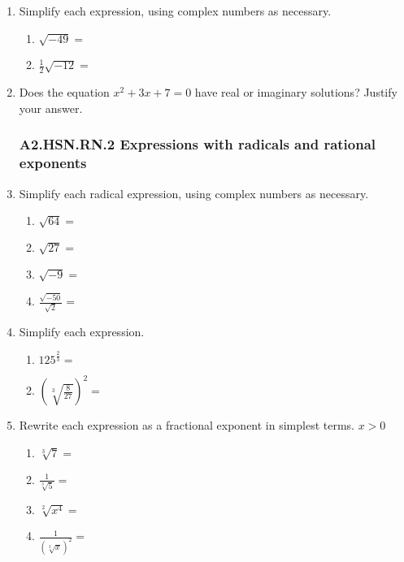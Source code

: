 \documentclass[12pt, twoside]{article}
\begin{document}
\begin{enumerate}[itemsep=0.5cm]
\item Simplify each expression, using complex numbers as necessary.
    \begin{multicols}{2}
    \begin{enumerate}[itemsep=0.5cm]
        \item $\sqrt{-49}=$
        \item $\displaystyle \frac{1}{2} \sqrt{-12}=$
    \end{enumerate}
    \end{multicols} \vspace{1cm}

\item Does the equation $x^2 + 3x + 7 = 0$ have real or imaginary solutions? Justify your answer.

\newpage
\subsubsection*{A2.HSN.RN.2 Expressions with radicals and rational exponents}
\item Simplify each radical expression, using complex numbers as necessary.
    \begin{multicols}{2}
    \begin{enumerate}[itemsep=0.5cm]
        \item $\sqrt{64}=$
        \item $\sqrt{27}=$
        \item $\sqrt{-9}=$
        \item $\displaystyle \frac{\sqrt{-50}}{\sqrt{2}}=$
    \end{enumerate}
    \end{multicols} \vspace{1cm}
    
\item Simplify each expression.
    \begin{multicols}{2}
    \begin{enumerate}[itemsep=0.5cm]
        \item $\displaystyle 125^{\frac{2}{3}} =$
        \item $\left( \sqrt[3]{\frac{8}{27}} \right)^{2} =$
    \end{enumerate}
    \end{multicols} \vspace{2cm}

    
\item Rewrite each expression as a fractional exponent in simplest terms. $x>0$
    \begin{multicols}{2}
      \begin{enumerate}[itemsep=1cm]
          \item $\sqrt[3]{7} =$
          \item $\displaystyle \frac{1}{\sqrt[3]{5}}=$
          \item $\sqrt[2]{x^4} =$
          \item $\displaystyle \frac{1}{(\sqrt[3]{x})^2}=$
      \end{enumerate}
      \end{multicols} \vspace{1cm}
  

\end{enumerate}
\end{document}
